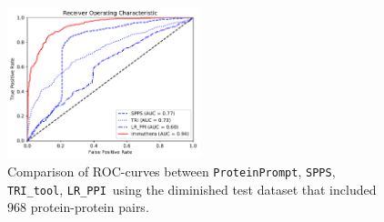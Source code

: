 \documentclass[preprint,3p,times,twocolumn]{elsarticle}
\newcommand{\spps}{\texttt{SPPS}}
\newcommand{\tri}{\texttt{TRI\_tool}}
\newcommand{\lr}{\texttt{LR\_PPI}}
\newcommand{\toolblank}{\texttt{ProteinPrompt}}
\newcommand{\tool}{\toolblank\hspace{2pt}}
\begin{document}
\begin{figure}
  \includegraphics[width=0.5\textwidth]{img/comparison_roc.pdf}
  \caption{Comparison of ROC-curves between \tool, \spps, \tri, \lr\ 
    using the diminished test dataset that included 968
    protein-protein pairs.}
  \label{fig:comparison}
\end{figure}

%
\end{document}
